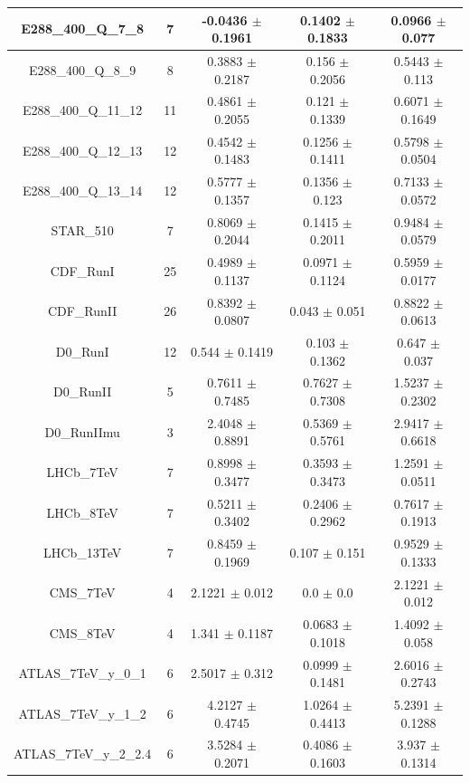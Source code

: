 \documentclass[
]{article}
\begin{document}
\begin{table}[h]
\begin{tabular}{|c|c|c|c|c|}
E288\_400\_Q\_7\_8 & 7 & -0.0436 \(\pm\) 0.1961 & 0.1402 \(\pm\)
0.1833 & 0.0966 \(\pm\) 0.077 \\ \hline
E288\_400\_Q\_8\_9 & 8 & 0.3883 \(\pm\) 0.2187 & 0.156 \(\pm\)
0.2056 & 0.5443 \(\pm\) 0.113 \\ \hline
E288\_400\_Q\_11\_12 & 11 & 0.4861 \(\pm\) 0.2055 & 0.121 \(\pm\)
0.1339 & 0.6071 \(\pm\) 0.1649 \\ \hline
E288\_400\_Q\_12\_13 & 12 & 0.4542 \(\pm\) 0.1483 & 0.1256 \(\pm\)
0.1411 & 0.5798 \(\pm\) 0.0504 \\ \hline
E288\_400\_Q\_13\_14 & 12 & 0.5777 \(\pm\) 0.1357 & 0.1356 \(\pm\)
0.123 & 0.7133 \(\pm\) 0.0572 \\ \hline
STAR\_510 & 7 & 0.8069 \(\pm\) 0.2044 & 0.1415 \(\pm\) 0.2011 & 0.9484
\(\pm\) 0.0579 \\ \hline
CDF\_RunI & 25 & 0.4989 \(\pm\) 0.1137 & 0.0971 \(\pm\) 0.1124 & 0.5959
\(\pm\) 0.0177 \\ \hline
CDF\_RunII & 26 & 0.8392 \(\pm\) 0.0807 & 0.043 \(\pm\) 0.051 & 0.8822
\(\pm\) 0.0613 \\ \hline
D0\_RunI & 12 & 0.544 \(\pm\) 0.1419 & 0.103 \(\pm\) 0.1362 & 0.647
\(\pm\) 0.037 \\ \hline
D0\_RunII & 5 & 0.7611 \(\pm\) 0.7485 & 0.7627 \(\pm\) 0.7308 & 1.5237
\(\pm\) 0.2302 \\ \hline
D0\_RunIImu & 3 & 2.4048 \(\pm\) 0.8891 & 0.5369 \(\pm\) 0.5761 & 2.9417
\(\pm\) 0.6618 \\ \hline
LHCb\_7TeV & 7 & 0.8998 \(\pm\) 0.3477 & 0.3593 \(\pm\) 0.3473 & 1.2591
\(\pm\) 0.0511 \\ \hline
LHCb\_8TeV & 7 & 0.5211 \(\pm\) 0.3402 & 0.2406 \(\pm\) 0.2962 & 0.7617
\(\pm\) 0.1913 \\ \hline
LHCb\_13TeV & 7 & 0.8459 \(\pm\) 0.1969 & 0.107 \(\pm\) 0.151 & 0.9529
\(\pm\) 0.1333 \\ \hline
CMS\_7TeV & 4 & 2.1221 \(\pm\) 0.012 & 0.0 \(\pm\) 0.0 & 2.1221 \(\pm\)
0.012 \\ \hline
CMS\_8TeV & 4 & 1.341 \(\pm\) 0.1187 & 0.0683 \(\pm\) 0.1018 & 1.4092
\(\pm\) 0.058 \\ \hline
ATLAS\_7TeV\_y\_0\_1 & 6 & 2.5017 \(\pm\) 0.312 & 0.0999 \(\pm\)
0.1481 & 2.6016 \(\pm\) 0.2743 \\ \hline
ATLAS\_7TeV\_y\_1\_2 & 6 & 4.2127 \(\pm\) 0.4745 & 1.0264 \(\pm\)
0.4413 & 5.2391 \(\pm\) 0.1288 \\ \hline
ATLAS\_7TeV\_y\_2\_2.4 & 6 & 3.5284 \(\pm\) 0.2071 & 0.4086 \(\pm\)
0.1603 & 3.937 \(\pm\) 0.1314 \\ \hline

\end{tabular}
\end{table}
\end{document}
